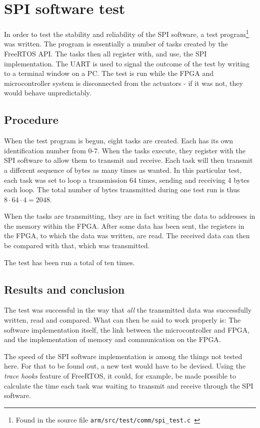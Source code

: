 \chapter{SPI software test}\label{sec:armspitest}
In order to test the stability and reliability of the SPI software, a test program\footnote{Found in the source file \texttt{arm/src/test/comm/spi\_test.c
}} was written. The program is essentially a number of tasks created by the FreeRTOS API. The tasks then all register with, and use, the SPI implementation. The UART is used to signal the outcome of the test by writing to a terminal window on a PC. The test is run while the FPGA and microcontroller system is disconnected from the actuators - if it was not, they would behave unpredictably.


\section{Procedure}
When the test program is begun, eight tasks are created. Each has its own identification number from 0-7. When the tasks execute, they register with the SPI software to allow them to transmit and receive. Each task will then transmit a different sequence of bytes as many times as wanted. In this particular test, each task was set to loop a transmission 64 times, sending and receiving 4 bytes each loop. The total number of bytes transmitted during one test run is thus $8 \cdot 64 \cdot 4 = 2048$.

When the tasks are transmitting, they are in fact writing the data to addresses in the memory within the FPGA. After some data has been sent, the registers in the FPGA, to which the data was written, are read. The received data can then be compared with that, which was transmitted.

The test has been run a total of ten times.

\section{Results and conclusion}
The test was successful in the way that \textit{all} the transmitted data was successfully written, read and compared. What can then be said to work properly is: The software implementation itself, the link between the microcontroller and FPGA, and the implementation of memory and communication on the FPGA. 

The speed of the SPI software implementation is among the things not tested here. For that to be found out, a new test would have to be devised. Using the \textit{trace hooks} feature of FreeRTOS, it could, for example, be made possible to calculate the time each task was waiting to transmit and receive through the SPI software.


